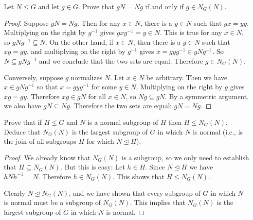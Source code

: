  Let $N\leq G$ and let $g\in G$. Prove that $gN = Ng$ if
and only if $g\in N_G(N)$.
\begin{proof}
  Suppose $gN = Ng$. Then for any $x\in N$, there is a $y\in N$ such
  that $gx = yg$. Multiplying on the right by $g^{-1}$ gives
  $gxg^{-1} = y\in N$. This is true for any $x\in N$, so
  $gNg^{-1}\subseteq N$. On the other hand, if $x\in N$, then there is
  a $y\in N$ such that $xg = gy$, and multiplying on the right by
  $g^{-1}$ gives $x = gyg^{-1}\in gNg^{-1}$. So $N\subseteq gNg^{-1}$
  and we conclude that the two sets are equal. Therefore
  $g\in N_G(N)$.

  Conversely, suppose $g$ normalizes $N$. Let $x\in N$ be
  arbitrary. Then we have $x\in gNg^{-1}$ so that $x = gyg^{-1}$ for
  some $y\in N$. Multiplying on the right by $g$ gives $xg =
  gy$. Therefore $xg\in gN$ for all $x\in N$, so $Ng\subseteq gN$. By
  a symmetric argument, we also have $gN\subseteq Ng$. Therefore the
  two sets are equal: $gN = Ng$.
\end{proof}

 Prove that if $H\leq G$ and $N$ is a normal subgroup of
$H$ then $H\leq N_G(N)$. Deduce that $N_G(N)$ is the largest subgroup
of $G$ in which $N$ is normal (i.e., is the join of all subgroups $H$
for which $N\trianglelefteq H$).
\begin{proof}
  We already know that $N_G(N)$ is a subgroup, so we only need to
  establish that $H\subseteq N_G(N)$. But this is easy: Let $h\in
  H$. Since $N\trianglelefteq H$ we have $hNh^{-1} = N$. Therefore
  $h\in N_G(N)$. This shows that $H\leq N_G(N)$.

  Clearly $N\trianglelefteq N_G(N)$, and we have shown that every
  subgroup of $G$ in which $N$ is normal must be a subgroup of
  $N_G(N)$. This implies that $N_G(N)$ is the largest subgroup of $G$
  in which $N$ is normal.
\end{proof}

